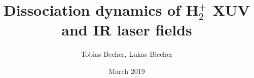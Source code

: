 \documentclass[12pt]{article}
\title{Dissociation dynamics of H$_2^+$ XUV and IR laser fields}
\author{Tobias Becher, Lukas Blecher}
\date{March 2019}
\begin{document}
\maketitle
\begin{abstract}
    
\end{abstract}




\end{document}
